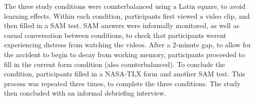 \documentclass[../main/Feedback.tex]{subfiles}
\begin{document}
The three study conditions were counterbalanced using a Latin square, to avoid learning effects. Within each condition, participants first viewed a video clip, and then filled in a SAM test. SAM answers were informally monitored, as well as casual conversation between conditions, to check that participants werent experiencing distress from watching the videos. After a 2-minute gap, to allow for the accident to begin to decay from working memory, participants proceeded to fill in the current form condition (also counterbalanced). To conclude the condition, participants filled in a NASA-TLX form and another SAM test. 
This process was repeated three times, to complete the three conditions. 
The study then concluded with an informal debriefing interview.
\end{document}
